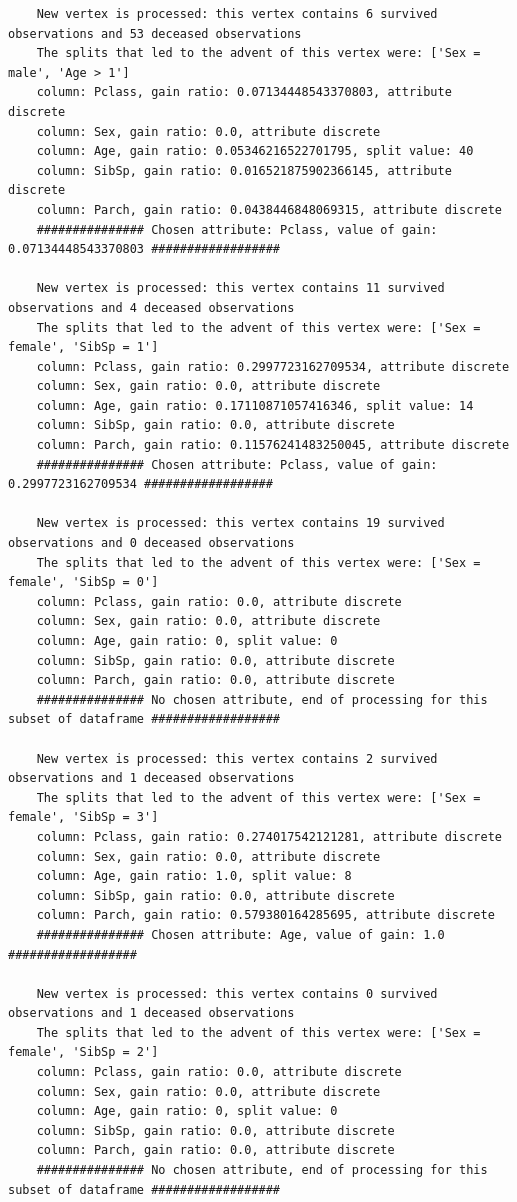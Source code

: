 \documentclass[12pt]{article}
\begin{document}
\begin{verbatim}
	New vertex is processed: this vertex contains 6 survived observations and 53 deceased observations
	The splits that led to the advent of this vertex were: ['Sex = male', 'Age > 1']
	column: Pclass, gain ratio: 0.07134448543370803, attribute discrete
	column: Sex, gain ratio: 0.0, attribute discrete
	column: Age, gain ratio: 0.05346216522701795, split value: 40
	column: SibSp, gain ratio: 0.016521875902366145, attribute discrete
	column: Parch, gain ratio: 0.0438446848069315, attribute discrete
	############### Chosen attribute: Pclass, value of gain: 0.07134448543370803 ##################
	
	New vertex is processed: this vertex contains 11 survived observations and 4 deceased observations
	The splits that led to the advent of this vertex were: ['Sex = female', 'SibSp = 1']
	column: Pclass, gain ratio: 0.2997723162709534, attribute discrete
	column: Sex, gain ratio: 0.0, attribute discrete
	column: Age, gain ratio: 0.17110871057416346, split value: 14
	column: SibSp, gain ratio: 0.0, attribute discrete
	column: Parch, gain ratio: 0.11576241483250045, attribute discrete
	############### Chosen attribute: Pclass, value of gain: 0.2997723162709534 ##################
	
	New vertex is processed: this vertex contains 19 survived observations and 0 deceased observations
	The splits that led to the advent of this vertex were: ['Sex = female', 'SibSp = 0']
	column: Pclass, gain ratio: 0.0, attribute discrete
	column: Sex, gain ratio: 0.0, attribute discrete
	column: Age, gain ratio: 0, split value: 0
	column: SibSp, gain ratio: 0.0, attribute discrete
	column: Parch, gain ratio: 0.0, attribute discrete
	############### No chosen attribute, end of processing for this subset of dataframe ##################
	
	New vertex is processed: this vertex contains 2 survived observations and 1 deceased observations
	The splits that led to the advent of this vertex were: ['Sex = female', 'SibSp = 3']
	column: Pclass, gain ratio: 0.274017542121281, attribute discrete
	column: Sex, gain ratio: 0.0, attribute discrete
	column: Age, gain ratio: 1.0, split value: 8
	column: SibSp, gain ratio: 0.0, attribute discrete
	column: Parch, gain ratio: 0.579380164285695, attribute discrete
	############### Chosen attribute: Age, value of gain: 1.0 ##################
	
	New vertex is processed: this vertex contains 0 survived observations and 1 deceased observations
	The splits that led to the advent of this vertex were: ['Sex = female', 'SibSp = 2']
	column: Pclass, gain ratio: 0.0, attribute discrete
	column: Sex, gain ratio: 0.0, attribute discrete
	column: Age, gain ratio: 0, split value: 0
	column: SibSp, gain ratio: 0.0, attribute discrete
	column: Parch, gain ratio: 0.0, attribute discrete
	############### No chosen attribute, end of processing for this subset of dataframe ##################
	

\end{verbatim}
\end{document}
